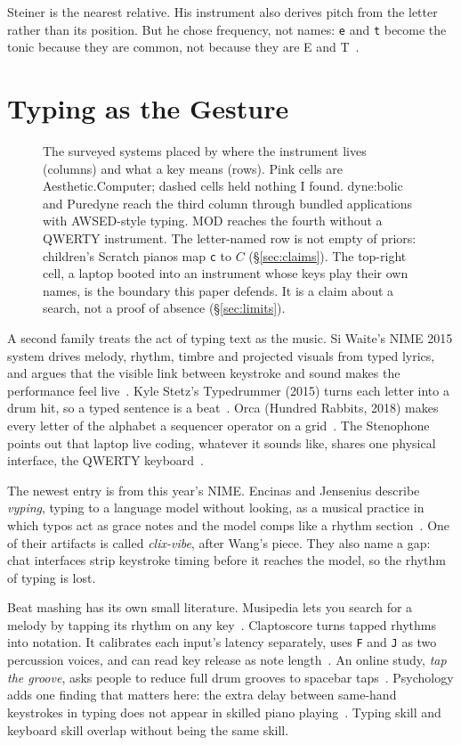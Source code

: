 \documentclass[10pt,letterpaper,twocolumn]{article}
\newcommand{\acdot}{{\color{acpink}.}}
\newcommand{\ac}{Aesthetic{\acdot}Computer}
\newcommand{\key}[1]{\texttt{#1}}
\begin{document}
Steiner is the nearest relative. His instrument also derives pitch from the letter rather than its position. But he chose frequency, not names: \key{e} and \key{t} become the tonic because they are common, not because they are E and T~\citep{steiner2005typist}.

\section{Typing as the Gesture}

\begin{figure}[t]
\centering

\caption{The surveyed systems placed by where the instrument lives (columns) and what a key means (rows). Pink cells are \ac{}; dashed cells held nothing I found. dyne:bolic and Puredyne reach the third column through bundled applications with AWSED-style typing. MOD reaches the fourth without a QWERTY instrument. The letter-named row is not empty of priors: children's Scratch pianos map \key{c} to $C$ (§\ref{sec:claims}). The top-right cell, a laptop booted into an instrument whose keys play their own names, is the boundary this paper defends. It is a claim about a search, not a proof of absence (§\ref{sec:limits}).}
\label{fig:positioning}
\end{figure}

A second family treats the act of typing text as the music. Si Waite's NIME 2015 system drives melody, rhythm, timbre and projected visuals from typed lyrics, and argues that the visible link between keystroke and sound makes the performance feel live~\citep{waite2015keyboard}. Kyle Stetz's Typedrummer (2015) turns each letter into a drum hit, so a typed sentence is a beat~\citep{vanhemert2015typedrummer}. Orca (Hundred Rabbits, 2018) makes every letter of the alphabet a sequencer operator on a grid~\citep{orca2018}. The Stenophone points out that laptop live coding, whatever it sounds like, shares one physical interface, the QWERTY keyboard~\citep{stenophone2017}.

The newest entry is from this year's NIME. Encinas and Jensenius describe \emph{vyping}, typing to a language model without looking, as a musical practice in which typos act as grace notes and the model comps like a rhythm section~\citep{encinas2026vyping}. One of their artifacts is called \emph{clix-vibe}, after Wang's piece. They also name a gap: chat interfaces strip keystroke timing before it reaches the model, so the rhythm of typing is lost.

Beat mashing has its own small literature. Musipedia lets you search for a melody by tapping its rhythm on any key~\citep{typke_musipedia}. Claptoscore turns tapped rhythms into notation. It calibrates each input's latency separately, uses \key{F} and \key{J} as two percussion voices, and can read key release as note length~\citep{claptoscore}. An online study, \emph{tap the groove}, asks people to reduce full drum grooves to spacebar taps~\citep{tapthegroove}. Psychology adds one finding that matters here: the extra delay between same-hand keystrokes in typing does not appear in skilled piano playing~\citep{schmuckler1997interkey}. Typing skill and keyboard skill overlap without being the same skill.
\end{document}
